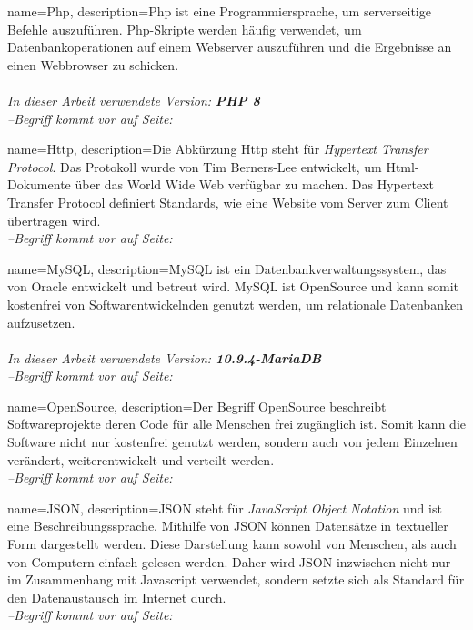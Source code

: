{
    name=Php,
    description={Php ist eine Programmiersprache, um serverseitige Befehle auszuführen. Php-Skripte werden häufig verwendet, um Datenbankoperationen auf einem Webserver auszuführen und die Ergebnisse an einen Webbrowser zu schicken.\\ \\
            \textit{In dieser Arbeit verwendete Version: \textbf{PHP 8}}
            ~\cite{Php}}
    \\\textit{--Begriff kommt vor auf Seite: }
}

{
    name=Http,
    description={Die Abkürzung Http steht für \textit{Hypertext Transfer Protocol}. Das Protokoll wurde von Tim Berners-Lee entwickelt, um \gls{Html}-Dokumente über das World Wide Web verfügbar zu machen. Das Hypertext Transfer Protocol definiert Standards, wie eine Website vom Server zum Client übertragen wird.
            ~\cite{http}}
    \\\textit{--Begriff kommt vor auf Seite: }
}

{
    name=MySQL,
    description={MySQL ist ein Datenbankverwaltungssystem, das von Oracle entwickelt und betreut wird. MySQL ist OpenSource und kann somit kostenfrei von Softwarentwickelnden genutzt werden, um relationale Datenbanken aufzusetzen.\\ \\
            \textit{In dieser Arbeit verwendete Version: \textbf{10.9.4-MariaDB}}
            ~\cite{mariadb}}
    \\\textit{--Begriff kommt vor auf Seite: }
}

{
    name=OpenSource,
    description={Der Begriff OpenSource beschreibt Softwareprojekte deren Code für alle Menschen frei zugänglich ist. Somit kann die Software nicht nur kostenfrei genutzt werden, sondern auch von jedem Einzelnen verändert, weiterentwickelt und verteilt werden.}
    \\\textit{--Begriff kommt vor auf Seite: }
}

{
    name=JSON,
    description={JSON steht für \textit{JavaScript Object Notation} und ist eine Beschreibungssprache. Mithilfe von JSON können Datensätze in textueller Form dargestellt werden. Diese Darstellung kann sowohl von Menschen, als auch von Computern einfach gelesen werden. Daher wird JSON inzwischen nicht nur im Zusammenhang mit \gls{Javascript} verwendet, sondern setzte sich als Standard für den Datenaustausch im Internet durch.
            ~\cite{json}}
    \\\textit{--Begriff kommt vor auf Seite: }
}

